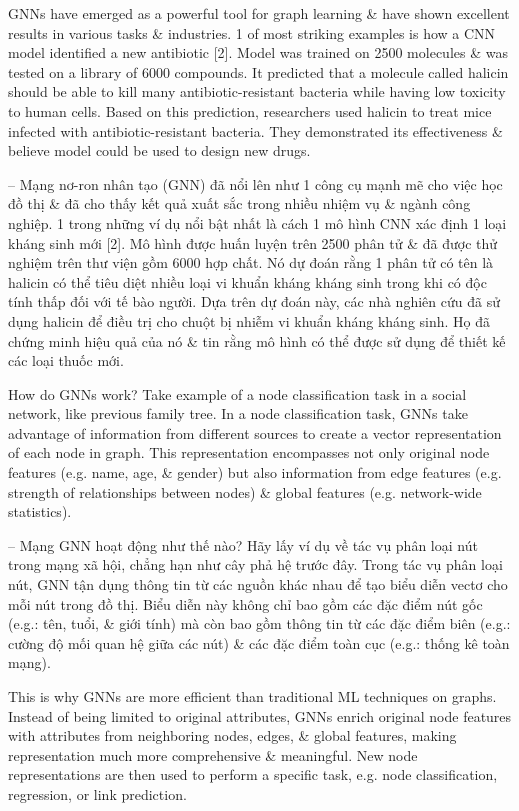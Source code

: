 \documentclass{article}
\begin{document}
\begin{itemize}
\begin{itemize}
        GNNs have emerged as a powerful tool for graph learning \& have shown excellent results in various tasks \& industries. 1 of most striking examples is how a CNN model identified a new antibiotic [2]. Model was trained on 2500 molecules \& was tested on a library of 6000 compounds. It predicted that a molecule called halicin should be able to kill many antibiotic-resistant bacteria while having low toxicity to human cells. Based on this prediction, researchers used halicin to treat mice infected with antibiotic-resistant bacteria. They demonstrated its effectiveness \& believe model could be used to design new drugs.

        -- Mạng nơ-ron nhân tạo (GNN) đã nổi lên như 1 công cụ mạnh mẽ cho việc học đồ thị \& đã cho thấy kết quả xuất sắc trong nhiều nhiệm vụ \& ngành công nghiệp. 1 trong những ví dụ nổi bật nhất là cách 1 mô hình CNN xác định 1 loại kháng sinh mới [2]. Mô hình được huấn luyện trên 2500 phân tử \& đã được thử nghiệm trên thư viện gồm 6000 hợp chất. Nó dự đoán rằng 1 phân tử có tên là halicin có thể tiêu diệt nhiều loại vi khuẩn kháng kháng sinh trong khi có độc tính thấp đối với tế bào người. Dựa trên dự đoán này, các nhà nghiên cứu đã sử dụng halicin để điều trị cho chuột bị nhiễm vi khuẩn kháng kháng sinh. Họ đã chứng minh hiệu quả của nó \& tin rằng mô hình có thể được sử dụng để thiết kế các loại thuốc mới.

        How do GNNs work? Take example of a node classification task in a social network, like previous family tree. In a node classification task, GNNs take advantage of information from different sources to create a vector representation of each node in graph. This representation encompasses not only original node features (e.g. name, age, \& gender) but also information from edge features (e.g. strength of relationships between nodes) \& global features (e.g. network-wide statistics).

        -- Mạng GNN hoạt động như thế nào? Hãy lấy ví dụ về tác vụ phân loại nút trong mạng xã hội, chẳng hạn như cây phả hệ trước đây. Trong tác vụ phân loại nút, GNN tận dụng thông tin từ các nguồn khác nhau để tạo biểu diễn vectơ cho mỗi nút trong đồ thị. Biểu diễn này không chỉ bao gồm các đặc điểm nút gốc (e.g.: tên, tuổi, \& giới tính) mà còn bao gồm thông tin từ các đặc điểm biên (e.g.: cường độ mối quan hệ giữa các nút) \& các đặc điểm toàn cục (e.g.: thống kê toàn mạng).

        This is why GNNs are more efficient than traditional ML techniques on graphs. Instead of being limited to original attributes, GNNs enrich original node features with attributes from neighboring nodes, edges, \& global features, making representation much more comprehensive \& meaningful. New node representations are then used to perform a specific task, e.g. node classification, regression, or link prediction.


\end{itemize}
\end{itemize}
\end{document}
